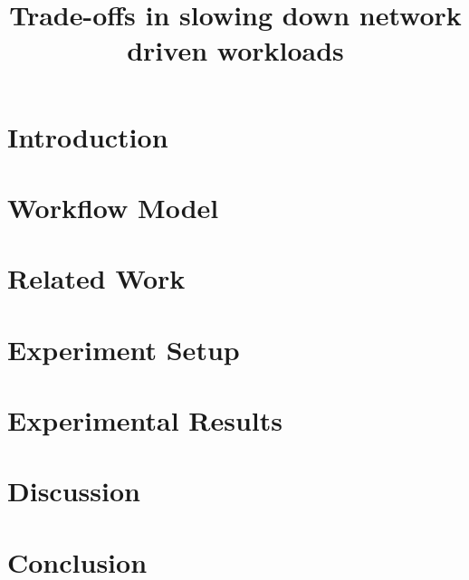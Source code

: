 \documentclass[sigplan,10pt]{acmart}
\begin{document}
\title{Trade-offs in slowing down network driven workloads}


\maketitle
\pagestyle{plain} %

\section{Introduction}


\section{Workflow Model}


\section{Related Work}


\section{Experiment Setup}


\section{Experimental Results}




\section{Discussion}


\section{Conclusion}



\end{document}
